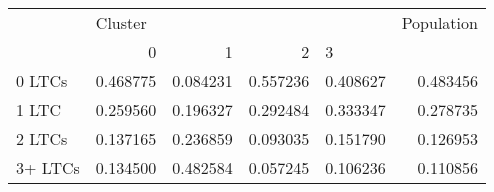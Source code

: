 \begin{tabular}{lrrrrr}
\toprule
{} & \multicolumn{4}{l}{Cluster} & Population \\
{} &         0 &         1 &         2 & \multicolumn{2}{l}{3} \\
\midrule
0 LTCs  &  0.468775 &  0.084231 &  0.557236 &  0.408627 &   0.483456 \\
1 LTC   &  0.259560 &  0.196327 &  0.292484 &  0.333347 &   0.278735 \\
2 LTCs  &  0.137165 &  0.236859 &  0.093035 &  0.151790 &   0.126953 \\
3+ LTCs &  0.134500 &  0.482584 &  0.057245 &  0.106236 &   0.110856 \\
\bottomrule
\end{tabular}

